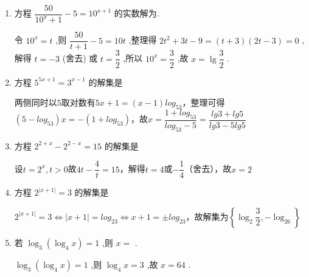 \begin{enumerate}
\begin{jieda}
\begin{enumerate}
            所以 $\dfrac{2}{x} + \dfrac{1}{y} = \dfrac{2}{{\log }_{3}{36}} + \dfrac{1}{{\log }_{4}{36}} = 2{\log }_{36}3 + {\log }_{36}4 = {\log }_{36}9 + {\log }_{36}4 = {\log }_{36}{36} = 1$
            \item 因为 $x{\log }_{2}3 = 1$ ,所以 ${\log }_{2}{3}^{x} = 1$ ,所以 ${3}^{x} = 2$ ,

            所以 ${3}^{x} + {9}^{-x} = {3}^{x} + {\left( {3}^{x}\right) }^{-2} = 2 + \dfrac{1}{4} = \dfrac{9}{4}$ .
        \end{enumerate}
    \end{jieda} 
    
    \item 方程 $\dfrac{50}{{10}^{x} + 1} - 5 = {10}^{x + 1}$ 的实数解为.
    \begin{jieda}
        令 ${10}^{x} = t$ ,则 $\dfrac{50}{t + 1} - 5 = {10t}$ ,整理得 $2{t}^{2} + {3t} - 9 = \left( {t + 3}\right) \left( {{2t} - 3}\right)  = 0$ ,解得 $t =  - 3$ (舍去) 或 $t = \dfrac{3}{2}$ ,所以 ${10}^{x} = \dfrac{3}{2}$ ,故 $x = \lg \dfrac{3}{2}$ .
    \end{jieda}
    
    \item 方程 ${5}^{{5x} + 1} = {3}^{x - 1}$ 的解集是
    \begin{jieda}
        两侧同时以$5$取对数有$5x+1 = (x-1)log_53$，整理可得$(5-log_53)x = -(1+log_53)$，故$x = \dfrac{1+log_53}{log_53-5} = \dfrac{lg3+lg5}{lg3-5lg5}$
    \end{jieda}
    \item 方程 ${2}^{2 + x} - {2}^{2 - x} = {15}$ 的解集是\blkda[4]{$\left\{2\right\}$}
    \begin{jieda}
        设$t = 2^x, t > 0$故$4t-\dfrac{4}{t} = 15$，解得$t = 4$或$-\dfrac{1}{4}$（舍去），故$x = 2$
    \end{jieda}
    \item 方程 ${2}^{\left| x + 1\right| } = 3$ 的解集是
    \begin{jieda}
        ${2}^{\left| x + 1\right| } = 3 \Longleftrightarrow |x+1| = log_23 \Longleftrightarrow x+1 = \pm log_23$，故解集为$\left\{  {{\log }_{2}\dfrac{3}{2}, - {\log }_26}\right\}$
    \end{jieda}
    
    \item 若 ${\log }_{3}\left( {{\log }_{4}x}\right)  = 1$ ,则 $x =$ .
    \begin{jieda}
        ${\log }_{3}\left( {{\log }_{4}x}\right)  = 1$ ,则 ${\log }_{4}x = 3$ ,故 $x = {64}$ .
    \end{jieda} 


\end{enumerate}
